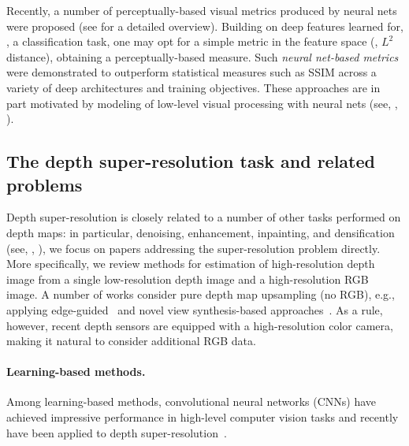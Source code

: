 Recently, a number of perceptually-based visual metrics produced by
neural nets were proposed (see \cite{Zhang_2018_CVPR} for a detailed overview). 
Building on deep features learned for, \eg, a classification task, one 
may opt for a simple metric in the feature space (\eg, $L^2$ distance),
obtaining a perceptually-based measure. Such \emph{neural net-based metrics}
were demonstrated to outperform statistical measures such as SSIM
across a variety of deep architectures and training objectives.
These approaches are in part motivated by modeling of low-level visual processing with neural nets (see, \eg, \cite{yamins2016using}).

\subsection{The depth super-resolution task and related problems}


Depth super-resolution is closely related to a number of other tasks performed on depth maps:  
in particular, denoising, enhancement, inpainting, and densification (see, \eg, \cite{chen2018estimating, cheng2018depth, mal2018sparse, hua2018normalized,chodosh2018deep, ma2018self, uhrig2017sparsity, yan2018ddrnet}), 
we focus on papers addressing the super-resolution problem directly. More specifically, we 
review methods for  estimation of high-resolution depth image 
from a single low-resolution depth image and a high-resolution RGB image.
A number of works consider pure depth map upsampling (no RGB), e.g.,  applying edge-guided~\cite{chen2018single} and novel view synthesis-based approaches~\cite{song2018deeply}. As a rule, however, recent depth sensors are equipped with a high-resolution color camera, making it natural to consider additional RGB data.


\paragraph{Learning-based methods.}
Among learning-based methods, convolutional neural networks (CNNs) have achieved impressive 
performance in high-level computer vision tasks and recently have been applied to depth super-resolution~\cite{chen2018single, song2018deeply,xiao2018joint, li2016deep,kim2018deformable,agresti2017deep,zhao2017simultaneously,hui2016depth,riegler2016deep,song2016deep}.

